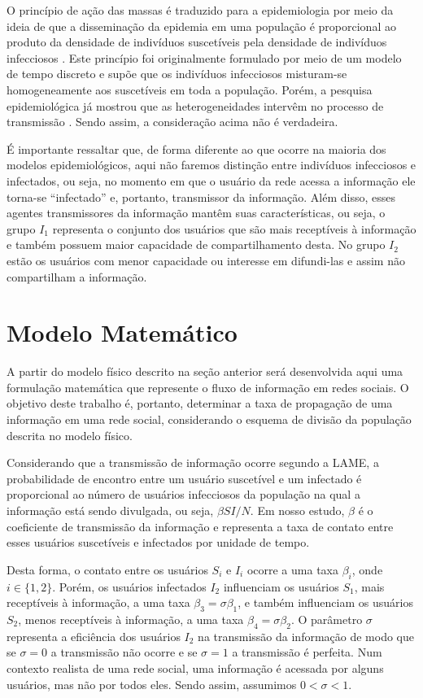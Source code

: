 \documentclass[
	12pt,				%
	openright,			%
	oneside,			%
	a4paper,			%
	english,			%
	french,				%
	spanish,			%
	brazil				%
	]{abntex2}
\begin{document}
O princípio de ação das massas é traduzido para a epidemiologia por
meio da ideia de que a disseminação da epidemia em uma população é
proporcional ao produto da densidade de indivíduos suscetíveis pela
densidade de indivíduos infecciosos \cite{massad1996}. Este princípio
foi originalmente formulado por meio de um modelo de tempo discreto e
supõe que os indivíduos infecciosos misturam-se homogeneamente aos
suscetíveis em toda a população. Porém, a pesquisa epidemiológica já
mostrou que as heterogeneidades intervêm no processo de transmissão
\cite{coutinho2004}. Sendo assim, a consideração acima não é
verdadeira.

É importante ressaltar que, de forma diferente ao que ocorre na
maioria dos modelos epidemiológicos, aqui não faremos distinção entre
indivíduos infecciosos e infectados, ou seja, no momento em que o
usuário da rede acessa a informação ele torna-se ``infectado'' e,
portanto, transmissor da informação. Além disso, esses agentes
transmissores da informação mantêm suas características, ou seja, o
grupo $I_1$ representa o conjunto dos usuários que são mais
receptíveis à informação e também possuem maior capacidade de
compartilhamento desta. No grupo $I_2$ estão os usuários com menor
capacidade ou interesse em difundi-las e assim não compartilham a
informação.


\chapter{Modelo Matemático}
A partir do modelo físico descrito na seção anterior será desenvolvida
aqui uma formulação matemática que represente o fluxo de informação em
redes sociais. O objetivo deste trabalho é, portanto, determinar a
taxa de propagação de uma informação em uma rede social, considerando
o esquema de divisão da população descrita no modelo físico.

Considerando que a transmissão de informação ocorre segundo a LAME, a
probabilidade de encontro entre um usuário suscetível e um infectado é
proporcional ao número de usuários infecciosos da população na qual a
informação está sendo divulgada, ou seja, $\beta SI / N$. Em nosso
estudo, $\beta$ é o coeficiente de transmissão da informação e
representa a taxa de contato entre esses usuários suscetíveis e
infectados por unidade de tempo.

Desta forma, o contato entre os usuários $S_i$ e $I_i$ ocorre a uma
taxa $\beta_i$, onde $i \in \{1,2\}$. Porém, os usuários infectados
$I_2$ influenciam os usuários $S_1$, mais receptíveis à informação, a
uma taxa $\beta_3 = \sigma \beta_1$, e também influenciam os usuários
$S_2$, menos receptíveis à informação, a uma taxa $\beta_4 = \sigma
\beta_2$. O parâmetro $\sigma$ representa a eficiência dos usuários
$I_2$ na transmissão da informação de modo que se $\sigma = 0$ a
transmissão não ocorre e se $\sigma = 1$ a transmissão é perfeita. Num
contexto realista de uma rede social, uma informação é acessada por
alguns usuários, mas não por todos eles. Sendo assim, assumimos $0 <
\sigma < 1$.
\end{document}
